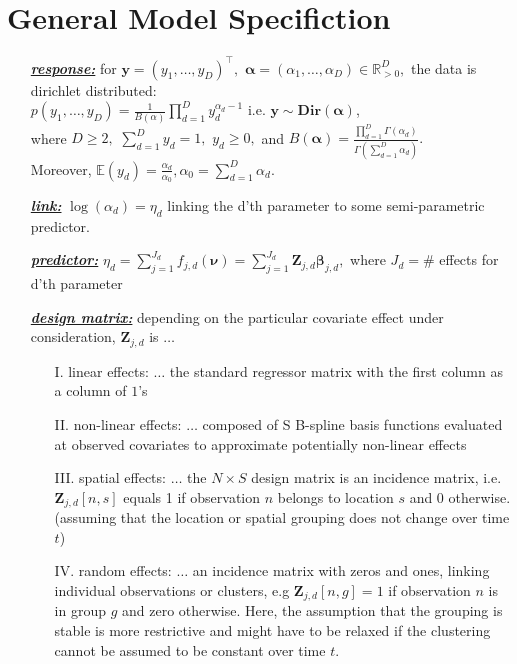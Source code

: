 \documentclass[a4paper,12pt]{scrartcl} %
\newcommand{\bs}{\boldsymbol}  %
\newcommand{\ad}{\alpha_d}
\newcommand{\bjd}{\bs{\beta}_{j,d}}
\newcommand{\Zjd}{\bs{Z}_{j,d}}
\newcommand{\fjd}{f_{j,d}(\bs{\nu})}
\newcommand{\etad}{\eta_{d}}
\newcommand{\Jd}{J_d}
\newcommand{\Dir}{\textbf{Dir}}
\newcommand{\sumd}{\sum_{d=1}^D}
\newcommand{\sumJd}{\sum_{j=1}^{J_d}}
\begin{document}
\section{General Model Specifiction}
\begin{itemize}
\item[\underline{\textbf{\textit{response:}}}] for $\bs{y}=(y_1,\ldots,y_D)^{\top}, $ $\bs{\alpha}=(\alpha_1,\ldots,\alpha_D)\in \mathbb{R}^D_{
>0},$ the data is dirichlet distributed:\\
$p(y_1,\ldots , y_D)= \frac{1}{B(\alpha)} \prod_{d=1}^{D} y_d^{\alpha_d - 1}$ i.e. $\bs{y}\sim \Dir(\bs\alpha)$,\\
where $D\geq 2, $ $\sum_{d=1}^D y_d=1, $ $y_d\geq 0, $ and $B(\bs{\alpha})=\frac{\prod_{d=1}^D\Gamma(\alpha_d)}{\Gamma\left(\sumd \alpha_d\right)}.$\\
Moreover, $\mathbb{E}(y_d)=\frac{\alpha_d}{\alpha_0}, \alpha_0=\sum_{d=1}^D \alpha_d$.
\item[\underline{\textbf{\textit{link:}}}] $\log(\ad)=\etad$ linking the d'th parameter to some semi-parametric predictor.
\item[\underline{\textbf{\textit{predictor:}}}] $\etad=\sumJd \fjd=\sumJd \Zjd\bjd, $ where $\Jd=\# $ effects for d'th parameter
\item[\underline{\textbf{\textit{design matrix:}}}] depending on the particular covariate effect under consideration, $\Zjd$ is $\ldots$
\begin{itemize}
\item[I. linear effects:] $\ldots$ the standard regressor matrix with the first column as a column of $1$'s
\item[II. non-linear effects:] $\ldots$ composed of S B-spline basis functions evaluated at observed covariates to approximate potentially non-linear effects
\item[III. spatial effects:] $\ldots$ the $N\times S$ design matrix is an incidence matrix, i.e. $\Zjd[n, s]$ equals 1 if observation $n$ belongs to location $s$ and 0 otherwise. (assuming that the location or spatial grouping does not change over time $t$)
\item[IV. random effects:] $\ldots$ an incidence matrix with zeros and ones, linking individual observations
or clusters, e.g $\Zjd[n, g] = 1$ if observation $n$ is in group $g$ and zero otherwise. Here, the assumption that the grouping is stable is more restrictive and might have to be relaxed if the clustering cannot be assumed to be constant over time $t$.
\end{itemize}

\end{itemize}
\end{document}
